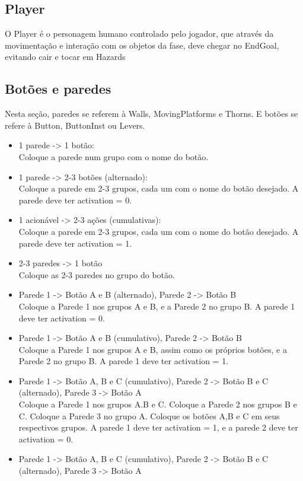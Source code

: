 \documentclass[a4paper, 11pt]{article}
\begin{document}
		\subsection{Player}
			O Player é o personagem humano controlado pelo jogador, que através da movimentação e interação com os objetos da fase, deve chegar no EndGoal, evitando cair e  tocar em Hazards

		\subsection{Botões e paredes}
			Nesta seção, paredes se referem à Walls, MovingPlatforms e Thorns. E botões se refere à Button, ButtonInst ou Levers.
			\begin{itemize}
				\item 1 parede -> 1 botão:
				\\
				Coloque a parede num grupo com o nome do botão.
				\item 1 parede -> 2-3 botões (alternado):
				\\
				Coloque a parede em 2-3 grupos, cada um com o nome do botão desejado.
				A parede deve ter activation = 0.
				\item 1 acionável -> 2-3 ações (cumulativas):
				\\
				Coloque a parede em 2-3 grupos, cada um com o nome do botão desejado.
				A parede deve ter activation = 1.
				\item 2-3 paredes -> 1 botão
				\\
				Coloque as 2-3 paredes no grupo do botão.
				\item Parede 1 -> Botão A e B (alternado), Parede 2 -> Botão B
				\\
				Coloque a Parede 1 nos grupos A e B, e a Parede 2 no grupo B.
				A parede 1 deve ter activation = 0.
				\item Parede 1 -> Botão A e B (cumulativo), Parede 2 -> Botão B
				\\
				Coloque a Parede 1 nos grupos A e B, assim como os próprios botões, e a Parede 2 no grupo B. 
				A parede 1 deve ter activation = 1.
				\item Parede 1 -> Botão A, B e C (cumulativo), Parede 2 -> Botão B e C (alternado), Parede 3 -> Botão A
				\\
				Coloque a Parede 1 nos grupos A.B e C. Coloque a Parede 2 nos grupos B e C. Coloque a Parede 3 no grupo A. Coloque os botões A,B e C em seus respectivos grupos.
				A parede 1 deve ter activation = 1, e a parede 2 deve ter activation = 0.
				\item Parede 1 -> Botão A, B e C (cumulativo), Parede 2 -> Botão B e C (alternado), Parede 3 -> Botão A

\end{itemize}
\end{document}
